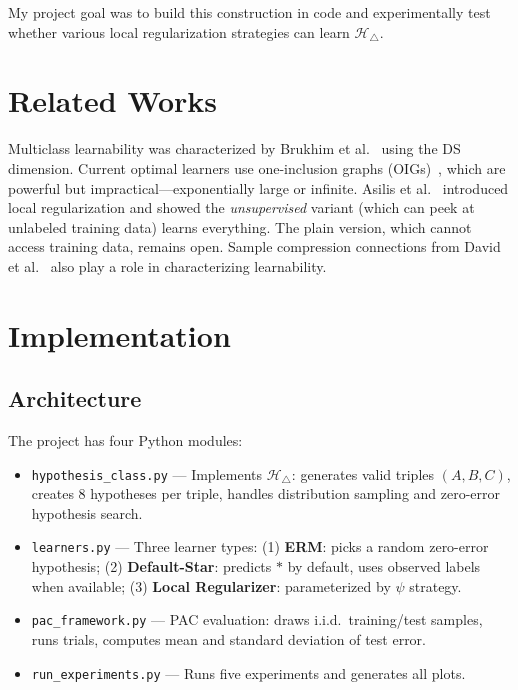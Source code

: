 \documentclass[final]{article}
\begin{document}
My project goal was to build this construction in code and experimentally test whether various local regularization strategies can learn $\mathcal{H}_\triangle$.

\section{Related Works}

Multiclass learnability was characterized by Brukhim et al.~\citep{brukhim2022} using the DS dimension. Current optimal learners use one-inclusion graphs (OIGs)~\citep{daniely2014}, which are powerful but impractical---exponentially large or infinite. Asilis et al.~\citep{asilis2024} introduced local regularization and showed the \textit{unsupervised} variant (which can peek at unlabeled training data) learns everything. The plain version, which cannot access training data, remains open. Sample compression connections from David et al.~\citep{david2016} also play a role in characterizing learnability.

\section{Implementation}

\subsection{Architecture}

The project has four Python modules:

\begin{itemize}[leftmargin=*,itemsep=2pt]
    \item \texttt{hypothesis\_class.py} --- Implements $\mathcal{H}_\triangle$: generates valid triples $(A, B, C)$, creates 8 hypotheses per triple, handles distribution sampling and zero-error hypothesis search.
    \item \texttt{learners.py} --- Three learner types: (1) \textbf{ERM}: picks a random zero-error hypothesis; (2) \textbf{Default-Star}: predicts $*$ by default, uses observed labels when available; (3) \textbf{Local Regularizer}: parameterized by $\psi$ strategy.
    \item \texttt{pac\_framework.py} --- PAC evaluation: draws i.i.d.\ training/test samples, runs trials, computes mean and standard deviation of test error.
    \item \texttt{run\_experiments.py} --- Runs five experiments and generates all plots.
\end{itemize}
\end{document}
